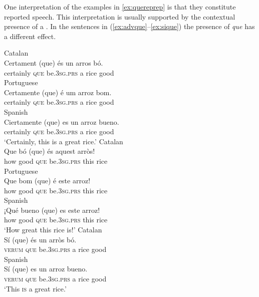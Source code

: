 \begin{sloppypar}
One interpretation  of the examples in  \eqref{ex:quereprep}  is that they constitute reported speech. This interpretation is usually supported by the contextual presence of a \emph{}.  In the sentences in (\ref{ex:advque}--\ref{ex:sique}) the presence of  \emph{que} has a different effect. 
\end{sloppypar}

\ea\label{ex:advque}
\ea
Catalan\\
\gll Certament (que) és un arros bó. \\
certainly \textsc{que} be.\textsc{3sg.prs} a rice good\\
\ex
Portuguese\\
\gll Certamente (que) é um arroz bom. \\
certainly \textsc{que} be.\textsc{3sg.prs} a rice good\\
\ex
Spanish\\
\gll Ciertamente (que) es un arroz bueno. \\
certainly \textsc{que} be.\textsc{3sg.prs} a rice good\\
\glt`Certainly, this is  a great rice.'
\z
\ex\label{ex:exclque}
\ea
Catalan\\
\gll Que bó (que) és aquest arròs! \\
	how good \textsc{que} be.\textsc{3sg.prs} this rice\\
\ex
Portuguese\\
\gll Que bom (que) é este arroz! \\
	how good \textsc{que} be.\textsc{3sg.prs} this rice\\
\ex
Spanish\\
\gll ¡Qué bueno (que) es este arroz! \\
	how good \textsc{que} be.\textsc{3sg.prs} this rice\\
\glt`How great this rice is!'
\z
\ex\label{ex:sique}
\ea
Catalan\\
\gll Sí (que) és un arròs bó. \\
\textsc{verum} \textsc{que} be.\textsc{3sg.prs} a rice good\\
\ex
Spanish\\
\gll Sí (que) es un arroz bueno. \\
\textsc{verum} \textsc{que} be.\textsc{3sg.prs} a rice good\\
\glt`This \textsc{is} a great rice.'
\z
\z

